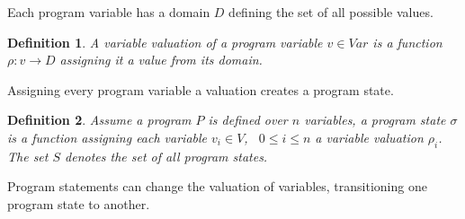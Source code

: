 \documentclass{article}
\newcounter{example}[section]
\newtheorem{mydef}{Definition}
\newcommand\mycom[1]{}
\newcommand\mycom[1]{#1}
\newcommand{\dd}[1]{\mycom{\todo[color=orange!40,inline]{\small DD: #1}}}
\begin{document}
\begin{example}
\begin{figure}[H]
    \label{fig:ex:p0:cfg}
\end{figure}
\end{example}

\dd{It is useful to wrap all the function symbols in Latex macros}
Each program variable has a domain $D$ defining the set of all possible values.
\begin{mydef}
    A variable valuation of a program variable $v \in Var$ is a function $\rho: v \rightarrow D$  assigning it a value from its domain.
\end{mydef}
Assigning every program variable a valuation creates a program state.


\begin{mydef}
    Assume a program $P$ is defined over $n$ variables, a program state $\sigma$ is a function assigning each variable $v_i \in V$, \ $0 \leq i \leq n$ a variable valuation $\rho_i$. The set $S$ denotes the set of all program states.
\end{mydef}

Program statements can change the valuation of variables, transitioning one program state to another.
\end{document}
